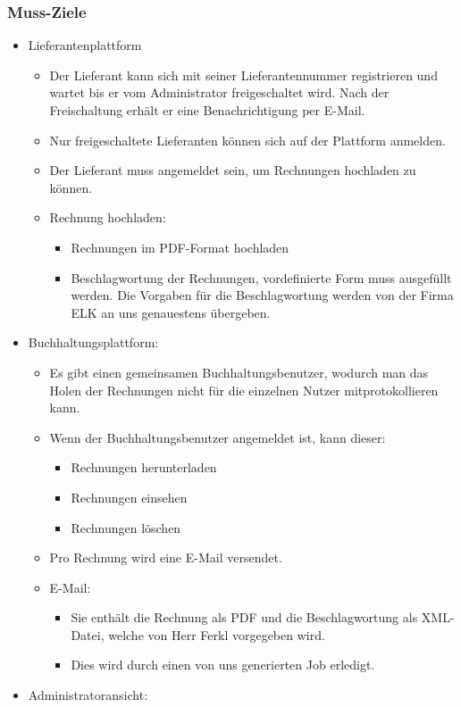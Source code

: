 \subsubsection{Muss-Ziele}
\begin{itemize}
\item Lieferantenplattform 

\begin{itemize}
\item Der Lieferant kann sich mit seiner Lieferantennummer registrieren
und wartet bis er vom Administrator freigeschaltet wird. Nach der
Freischaltung erhält er eine Benachrichtigung per E-Mail. 
\item Nur freigeschaltete Lieferanten können sich auf der Plattform anmelden. 
\item Der Lieferant muss angemeldet sein, um Rechnungen hochladen zu können. 
\item Rechnung hochladen: 

\begin{itemize}
\item Rechnungen im PDF-Format hochladen 
\item Beschlagwortung der Rechnungen, vordefinierte Form muss ausgefüllt
werden. Die Vorgaben für die Beschlagwortung werden von der Firma
ELK an uns genauestens übergeben. 
\end{itemize}
\end{itemize}
\item Buchhaltungsplattform: 

\begin{itemize}
\item Es gibt einen gemeinsamen Buchhaltungsbenutzer, wodurch man das Holen
der Rechnungen nicht für die einzelnen Nutzer mitprotokollieren kann. 
\item Wenn der Buchhaltungsbenutzer angemeldet ist, kann dieser: 

\begin{itemize}
\item Rechnungen herunterladen 
\item Rechnungen einsehen 
\item Rechnungen löschen 
\end{itemize}
\item Pro Rechnung wird eine E-Mail versendet. 
\item E-Mail: 

\begin{itemize}
\item Sie enthält die Rechnung als PDF und die Beschlagwortung als XML-Datei,
welche von Herr Ferkl vorgegeben wird. 
\item Dies wird durch einen von uns generierten Job erledigt. 
\end{itemize}
\end{itemize}
\item Administratoransicht: 


\end{itemize}
